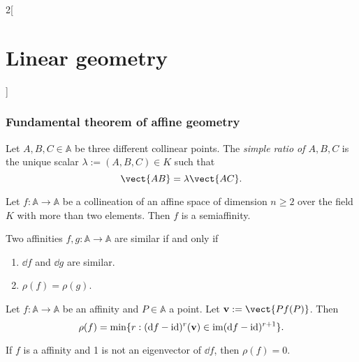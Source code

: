 \documentclass[../../../main.tex]{subfiles}
\begin{document}
\begin{multicols}{2}[\section{Linear geometry}]
    \subsubsection{Fundamental theorem of affine geometry}
    \begin{definition}
        Let $A,B,C\in\mathbb{A}$ be three different collinear points. The \textit{simple ratio of $A,B,C$} is the unique scalar $\lambda:=(A,B,C)\in K$ such that $$\vect{AB}=\lambda\vect{AC}.$$
        \begin{theorem}
            Let $f:\mathbb{A}\rightarrow\mathbb{A}$ be a collineation of an affine space of dimension $n\geq 2$ over the field $K$ with more than two elements. Then $f$ is a semiaffinity.
        \end{theorem}
        \begin{prop}
            Two affinities $f,g:\mathbb{A}\rightarrow\mathbb{A}$ are similar if and only if
            \begin{enumerate}
                \item $\dd f$ and $\dd g$ are similar.
                \item $\rho(f)=\rho(g)$.
            \end{enumerate}
        \end{prop}
        \begin{theorem}
            Let $f:\mathbb{A}\rightarrow\mathbb{A}$ be an affinity and $P\in\mathbb{A}$ a point. Let $\vf{v}:=\vect{Pf(P)}$. Then $$\rho(f)=\min\{r:(\dd f-\mathrm{id})^r(\boldsymbol{\mathrm{v}})\in\operatorname{im}(\dd f-\mathrm{id})^{r+1}\}.$$
        \end{theorem}
        \begin{corollary}
            If $f$ is a affinity and 1 is not an eigenvector of $\dd f$, then $\rho(f)=0$.
        \end{corollary}
    \end{definition}

\end{multicols}
\end{document}
